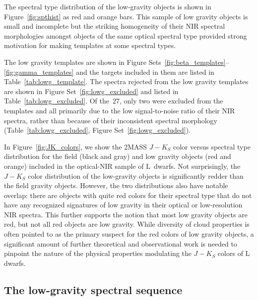 \documentclass[12pt,preprint]{aastex}
\newcommand{\optLowG}{27}
\begin{document}
The spectral type distribution of the low-gravity objects is shown in Figure~\ref{fig:spthist} as red and orange bars.
This sample of low gravity objects is small and incomplete but the striking homogeneity of their NIR spectral morphologies amongst objects of the same optical spectral type provided strong motivation for making templates at some spectral types.

The low gravity templates are shown in Figure Sets~\ref{fig:beta_templates}--\ref{fig:gamma_templates} and the targets included in them are listed in Table~\ref{tab:lowg_template}.
The spectra rejected from the low gravity templates are shown in Figure Set~\ref{fig:lowg_excluded} and listed in Table~\ref{tab:lowg_excluded}.
Of the~\optLowG, only two were excluded from the templates and all primarily due to the low signal-to-noise ratio of their NIR spectra, rather than because of their inconsistent spectral morphology (Table~\ref{tab:lowg_excluded}, Figure Set~\ref{fig:lowg_excluded}).

In Figure~\ref{fig:JK_colors}, we show the 2MASS $J-K_S$ color versus spectral type distribution for the field (black and gray) and low gravity objects (red and orange) included in the optical-NIR sample of L~dwarfs.
Not surprisingly, the $J-K_S$ color distribution of the low-gravity objects is significantly redder than the field gravity objects.
However, the two distributions also have notable overlap: there are objects with quite red colors for their spectral type that do not have any recognized signatures of low gravity in their optical or low-resolution NIR spectra.
This further supports the notion that most low gravity objects are red, but not all red objects are low gravity.
While diversity of cloud properties is often pointed to as the primary suspect for the red colors of low gravity objects, a significant amount of further theoretical and observational work is needed to pinpoint the nature of the physical properties modulating the $J-K_S$ colors of L dwarfs.

\subsection{The low-gravity spectral sequence}
\end{document}
